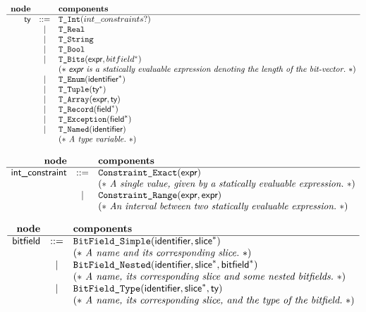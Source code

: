 \documentclass{book}
\begin{document}
\[
\begin{array}{rcll}
\textbf{node} & & \textbf{components} \\
\hline
\textsf{ty} &::=& \texttt{T\_Int}(int\_constraints?) \\
  &|& \texttt{T\_Real} \\
  &|& \texttt{T\_String} \\
  &|& \texttt{T\_Bool} \\
  &|& \texttt{T\_Bits}(\textsf{expr}, bitfield^{*}) \\
  & & (*\ \textit{\textsf{expr}\ is a statically evaluable expression denoting the length of the bit-vector.}\ *)\\
  &|& \texttt{T\_Enum}(\textsf{identifier}^{*}) \\
  &|& \texttt{T\_Tuple}(\textsf{ty}^{*}) \\
  &|& \texttt{T\_Array}(\textsf{expr}, \textsf{ty}) \\
  &|& \texttt{T\_Record}(\textsf{field}^{*}) \\
  &|& \texttt{T\_Exception}(\textsf{field}^{*}) \\
  &|& \texttt{T\_Named}(\textsf{identifier})\\
  & & (*\ \textit{A type variable.}\ *)\\
\end{array}
\]

\[
\begin{array}{rcll}
\textbf{node} & & \textbf{components} \\
\hline
\textsf{int\_constraint} &::=& \texttt{Constraint\_Exact}(\textsf{expr}) \\
  & & (*\ \textit{A single value, given by a statically evaluable expression.}\ *)\\
  &|& \texttt{Constraint\_Range}(\textsf{expr}, \textsf{expr}) \\
  & & (*\ \textit{An interval between two statically evaluable expression.}\ *)\\
\end{array}
\]

\[
\begin{array}{rcll}
\textbf{node} & & \textbf{components} \\
\hline
\textsf{bitfield} &::=& \texttt{BitField\_Simple}(\textsf{identifier}, \textsf{slice}^{*}) \\
  & & (*\ \textit{A name and its corresponding slice.}\ *)\\
  &|& \texttt{BitField\_Nested}(\textsf{identifier}, \textsf{slice}^{*}, \textsf{bitfield}^{*}) \\
  & & (*\ \textit{A name, its corresponding slice and some nested bitfields.}\ *)\\
  &|& \texttt{BitField\_Type}(\textsf{identifier}, \textsf{slice}^{*}, \textsf{ty}) \\
  & & (*\ \textit{A name, its corresponding slice, and the type of the bitfield.}\ *)\\
\end{array}
\]
\end{document}
